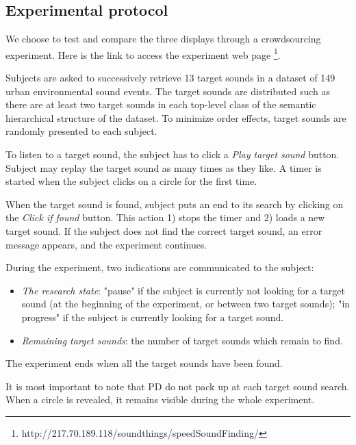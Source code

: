 \documentclass{aes2e}
\begin{document}
\subsection{Experimental protocol}
We choose to test and compare the three displays through a crowdsourcing experiment. Here is the link to access the experiment web page \footnote{http://217.70.189.118/soundthings/speedSoundFinding/}.

Subjects are asked to successively retrieve 13 target sounds in a dataset of 149 urban environmental sound events. The target sounds are distributed such as there are at least two target sounds in each top-level class of the semantic hierarchical structure of the dataset. To minimize order effects, target sounds are randomly presented to each subject.

To listen to a target sound, the subject has to click a \textit{Play target sound} button. Subject may replay the target sound  as many times as they like. A timer is started when the subject clicks on a circle for the first time.

When the target sound is found, subject puts an end to its search by clicking on the \textit{Click if found} button. This action 1) stops the timer and 2) loads a new target sound. If the subject does not find the correct target sound, an error message appears, and the experiment continues.

During the experiment, two indications are communicated to the subject:
\begin{itemize}
\item \textit{The research state}: "pause" if the subject is currently not looking for a target sound (at the beginning of the experiment, or between two target sounds);  "in progress"  if the subject is currently looking for a target sound.
\item \textit{Remaining target sounds}: the number of target sounds which remain to find.
\end{itemize}

The experiment ends when all the target sounds have been found.

It is most important to note that PD do not pack up at each target sound search. When a circle is revealed, it remains visible during the whole experiment.
\end{document}

